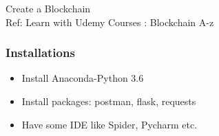 \begin{frame}[fragile]\frametitle{}
\begin{center}
{\Large Create a Blockchain}\\
{\small Ref: Learn with Udemy Courses : Blockchain A-z}
\end{center}
\end{frame}

\begin{frame}[fragile]\frametitle{Installations}
\begin{itemize}
\item Install Anaconda-Python 3.6
\item Install packages: postman, flask, requests
\item Have some IDE like Spider, Pycharm etc.
\end{itemize}
\end{frame}
